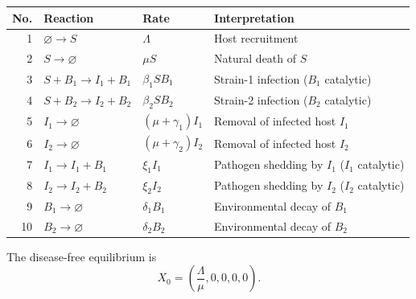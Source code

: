 \vspace{0.8em}
\renewcommand{\arraystretch}{1.2}
\begin{tabular}{rllp{5.2cm}}
\toprule
No. & Reaction & Rate & Interpretation \\
\midrule
1  & $\varnothing\to S$       & $\Lambda$               & Host recruitment \\
2  & $S\to\varnothing$        & $\mu S$                 & Natural death of $S$ \\
3  & $S+B_1\to I_1+B_1$      & $\beta_1 SB_1$          & Strain-1 infection ($B_1$ catalytic) \\
4  & $S+B_2\to I_2+B_2$      & $\beta_2 SB_2$          & Strain-2 infection ($B_2$ catalytic) \\
5  & $I_1\to\varnothing$      & $(\mu+\gamma_1)I_1$     & Removal of infected host $I_1$ \\
6  & $I_2\to\varnothing$      & $(\mu+\gamma_2)I_2$     & Removal of infected host $I_2$ \\
7  & $I_1\to I_1+B_1$        & $\xi_1 I_1$             & Pathogen shedding by $I_1$ ($I_1$ catalytic) \\
8  & $I_2\to I_2+B_2$        & $\xi_2 I_2$             & Pathogen shedding by $I_2$ ($I_2$ catalytic) \\
9  & $B_1\to\varnothing$      & $\delta_1 B_1$          & Environmental decay of $B_1$ \\
10 & $B_2\to\varnothing$      & $\delta_2 B_2$          & Environmental decay of $B_2$ \\
\bottomrule
\end{tabular}
\caption{Two-strain environmental transmission model.
  \emph{Left}: ODE/PDE system (\textbf{diffusing}: $B_1, B_2$;
  \textbf{non-diffusing}: $S, I_1, I_2$).
  Disease siphons: $\sigma_k=\{I_k,B_k\}$, $k=1,2$,
  and the joint siphon $\sigma_{12}=\{I_1,B_1,I_2,B_2\}$.
  \emph{Right}: species-reaction (Volpert/DSR hybrid) graph.
  All multi-species reactions are shown as bipartite nodes.
  Infection reactions~3--4 ($S+B_k\to I_k+B_k$): dotted arrows from
  $S$ and $B_k$ into the node, dashed arrow out to $I_k$.
  Shedding reactions~7--8 ($I_k\to I_k+B_k$): dotted arrow from $I_k$
  into the node, dashed arrows out to $I_k$ (returned) and $B_k$
  (produced); nodes placed above/below the species row to avoid overlap.
  \textbf{Dotted}: reactant $\to$ node;
  \textbf{dashed}: node $\to$ product.}
\eeF
The disease-free equilibrium is
$$
X_0=
\left(
\frac{\Lambda}{\mu},
0,0,0,0
\right).
$$

